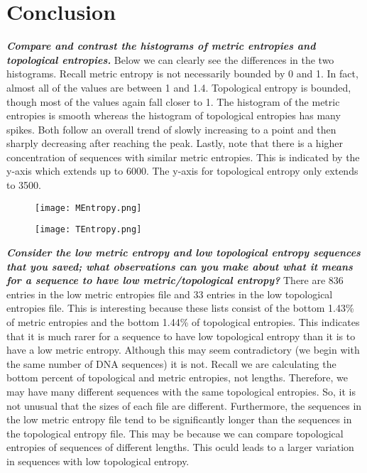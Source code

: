 \documentclass{article}
\begin{document}
\section{Conclusion}
\textbf{\textit{Compare and contrast the histograms of metric entropies and topological entropies.}}
\newline
\newline
Below we can clearly see the differences in the two histograms.
Recall metric entropy is not necessarily bounded by 0 and 1.
In fact, almost all of the values are between 1 and 1.4.
Topological entropy is bounded, though most of the values again fall closer to 1.
The histogram of the metric entropies is smooth whereas the histogram of topological entropies has many spikes.
Both follow an overall trend of slowly increasing to a point and then sharply decreasing after reaching the peak.
Lastly, note that there is a higher concentration of sequences with similar metric entropies.
This is indicated by the y-axis which extends up to 6000.
The y-axis for topological entropy only extends to 3500.
\begin{figure}[H]
    \centering
    \begin{minipage}{.5\textwidth}
      \centering
      \texttt{[image: MEntropy.png]}
      \label{fig:MetricEntropy}
    \end{minipage}%
    \begin{minipage}{.5\textwidth}
      \centering
      \texttt{[image: TEntropy.png]}
      \label{fig:TopologicalEntropy}
    \end{minipage}
    \end{figure}

\noindent\textbf{\textit{Consider the low metric entropy and low topological entropy sequences that you saved; what observations can you make about what it means for a sequence to have low metric/topological entropy?}}
\newline
\newline
There are 836 entries in the low metric entropies file and 33 entries in the low topological entropies file.
This is interesting because these lists consist of the bottom 1.43\% of metric entropies and the bottom 1.44\% of topological entropies.
This indicates that it is much rarer for a sequence to have low topological entropy than it is to have a low metric entropy.
Although this may seem contradictory (we begin with the same number of DNA sequences) it is not.
Recall we are calculating the bottom percent of topological and metric entropies, not lengths.
Therefore, we may have many different sequences with the same topological entropies.
So, it is not unusual that the sizes of each file are different.
Furthermore, the sequences in the low metric entropy file tend to be significantly longer than the sequences in the topological entropy file.
This may be because we can compare topological entropies of sequences of different lengths.
This oculd leads to a larger variation in sequences with low topological entropy.
\end{document}
